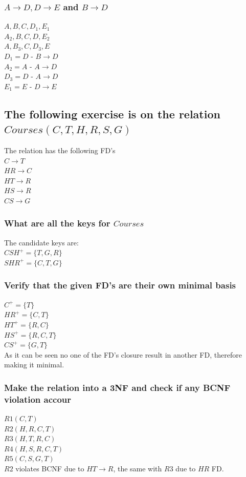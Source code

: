 \documentclass[12pt, a4paper]{article}
\begin{document}
					\subsubsection{$A\rightarrow D, D\rightarrow E$ and $B\rightarrow D$}
						$A,B,C,D_1,E_1$\\
						$A_2,B,C,D,E_2$\\
						$A,B_3,C,D_3,E$\\
						$D_1=D$ - $B\rightarrow D$\\
						$A_2=A$ - $A\rightarrow D$\\
						$D_3=D$ - $A\rightarrow D$\\
						$E_1=E$ - $D\rightarrow E$
				\subsection{The following exercise is on the relation $Courses(C,T,H,R,S,G)$}
					The relation has the following FD's\\
					$C\rightarrow T$\\
					$HR\rightarrow C$\\
					$HT\rightarrow R$\\
					$HS\rightarrow R$\\
					$CS\rightarrow G$
					\subsubsection{What are all the keys for $Courses$}
						The candidate keys are:\\
						$CSH^+=\{T,G,R\}$\\
						$SHR^+=\{C,T,G\}$
					\subsubsection{Verify that the given FD's are their own minimal basis}
						$C^+=\{T\}$\\
						$HR^+=\{C,T\}$\\
						$HT^+=\{R,C\}$\\
						$HS^+=\{R,C,T\}$\\
						$CS^+=\{G,T\}$\\
						As it can be seen no one of the FD's closure result in another FD, therefore making it minimal.
					\subsubsection{Make the relation into a 3NF and check if any BCNF violation accour}
						$R1(C,T)$\\
						$R2(H,R,C,T)$\\
						$R3(H,T,R,C)$\\
						$R4(H,S,R,C,T)$\\
						$R5(C,S,G,T)$\\
						$R2$ violates BCNF due to $HT\rightarrow R$, the same with $R3$ due to $HR$ FD.
\end{document}
